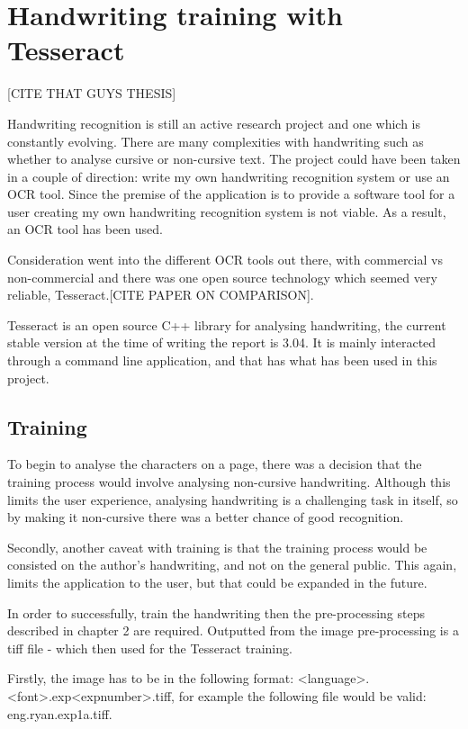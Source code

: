 \chapter{Handwriting training with Tesseract}

[CITE THAT GUYS THESIS]

Handwriting recognition is still an active research project and one which is constantly evolving. There are many complexities with handwriting such as whether to analyse cursive or non-cursive text. The project could have been taken in a couple of direction: write my own handwriting recognition system or use an OCR tool. Since the premise of the application is to provide a software tool for a user creating my own handwriting recognition system is not viable. As a result, an OCR tool has been used.

Consideration went into the different OCR tools out there, with commercial vs non-commercial and there was one open source technology which seemed very reliable, Tesseract.[CITE PAPER ON COMPARISON].

Tesseract is an open source C++ library for analysing handwriting, the current stable version at the time of writing the report is 3.04. It is mainly interacted through a command line application, and that has what has been used in this project.

\section{Training}

To begin to analyse the characters on a page, there was a decision that the training process would involve analysing non-cursive handwriting. Although this limits the user experience, analysing handwriting is a challenging task in itself, so by making it non-cursive there was a better chance of good recognition.

Secondly, another caveat with training is that the training process would be consisted on the author's handwriting, and not on the general public. This again, limits the application to the user, but that could be expanded in the future.

In order to successfully, train the handwriting then the pre-processing steps described in chapter 2 are required. Outputted from the image pre-processing is a tiff file - which then used for the Tesseract training.

Firstly, the image has to be in the following format: <language>.<font>.exp<expnumber>.tiff, for example the following file would be valid: eng.ryan.exp1a.tiff.
